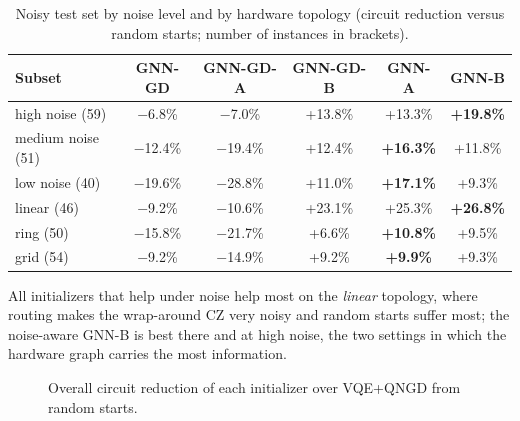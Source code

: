 \documentclass{ssnreview}
\begin{document}
\begin{table}[H]
\centering
\caption{Noisy test set by noise level and by hardware topology (circuit reduction versus
random starts; number of instances in brackets).}\label{tab:noiselevel}
\begin{tabular}{lccccc}
\toprule
Subset & GNN-GD & GNN-GD-A & GNN-GD-B & GNN-A & GNN-B \\
\midrule
high noise (59)   & $-$6.8\%  & $-$7.0\%  & +13.8\% & +13.3\% & \textbf{+19.8\%} \\
medium noise (51) & $-$12.4\% & $-$19.4\% & +12.4\% & \textbf{+16.3\%} & +11.8\% \\
low noise (40)    & $-$19.6\% & $-$28.8\% & +11.0\% & \textbf{+17.1\%} & +9.3\% \\
\midrule
linear (46) & $-$9.2\%  & $-$10.6\% & +23.1\% & +25.3\% & \textbf{+26.8\%} \\
ring (50)   & $-$15.8\% & $-$21.7\% & +6.6\%  & \textbf{+10.8\%} & +9.5\% \\
grid (54)   & $-$9.2\%  & $-$14.9\% & +9.2\%  & \textbf{+9.9\%} & +9.3\% \\
\bottomrule
\end{tabular}
\end{table}

All initializers that help under noise help most on the \emph{linear} topology, where routing
makes the wrap-around CZ very noisy and random starts suffer most; the noise-aware GNN-B is best
there and at high noise, the two settings in which the hardware graph carries the most
information.

\begin{figure}[H]
\centering
{}
\caption{Overall circuit reduction of each initializer over VQE+QNGD from random starts.}\label{fig:summary}
\end{figure}
\end{document}
